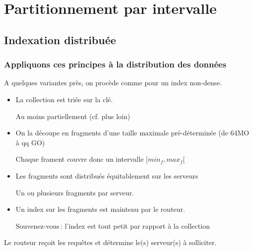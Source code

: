 

\section{Partitionnement par intervalle}

\subsection{Indexation distribuée}


\begin{frame}
\frametitle{Appliquons ces principes à la distribution des données}

A quelques variantes près, on procède comme pour un index non-dense.

\begin{itemize}
  \item La collection est triée sur la clé.
   
        \smallskip
   
       Au moins partiellement (cf. plus loin)
       
  \item On la découpe en fragments d'une taille maximale pré-déterminée (de 64MO à qq GO)
   
   \smallskip
   
        Chaque frament couvre donc un intervalle $[min_f, max_f[$
        
   \item Les fragments sont distribués équitablement sur les serveurs

    \smallskip
    
         Un ou plusieurs fragments par serveur.

   \item Un index sur les fragments est maintenu par le routeur.
 
    \smallskip
   
      \alert{Souvenez-vous\,: l'index est tout petit par rapport à la collection}
      
\end{itemize} 

\alert{Le routeur reçoit les requêtes et détermine le(s) serveur(s) à solliciter.}

\end{frame}

